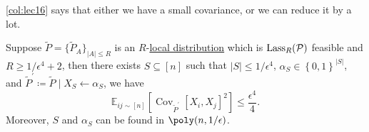 \begin{remark}
	\autoref{col:lec16} says that either we have a small covariance, or we can reduce it by a lot.
\end{remark}

\begin{theorem}\label{thm:lec16}
	Suppose \(\widetilde{P} =\{ \widetilde{P} _A \}_{\left\vert A \right\vert \leq R} \) is an \(R\)-\hyperref[def:local-distribution]{local distribution} which is \(\mathop{\mathrm{Lass}}_R(\mathcal{\MakeUppercase{p}})\) feasible and \(R \geq 1 / \epsilon ^4 + 2\), then there exists \(S \subseteq [n]\) such that \(\left\vert S \right\vert \leq 1 / \epsilon ^4\), \(\alpha _S \in \left\{ 0, 1 \right\} ^{\left\vert S \right\vert }\), and \(\widetilde{P} ^\prime \coloneqq \widetilde{P} \mid X_S\gets \alpha _S\), we have
	\[
		\mathbb{E}_{ij\sim [n]}\left[\mathop{\mathrm{Cov}}\nolimits_{\widetilde{P} ^\prime }\left[X_i, X_j \right]^{2} \right] \leq \frac{\epsilon ^4}{4}.
	\]
	Moreover, \(S\) and \(\alpha _S\) can be found in \(\poly(n, 1 / \epsilon )\).
\end{theorem}
